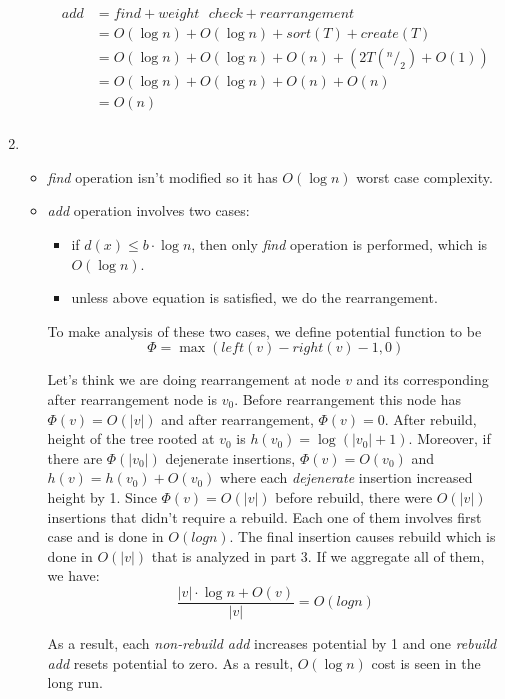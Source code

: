 \begin{enumerate}
\begin{itemize}
    \begin{align*}
      add &= find + weight\text{ }check + rearrangement \\
                  &= O(\log n) + O(\log n) + sort(T) + create(T) \\
                  &= O(\log n) + O(\log n)+ O(n) + (2T(^n/_2) + O(1)) \\
                  &= O(\log n) + O(\log n)+ O(n) + O(n) \\
                  &= O(n) \\
    \end{align*}
  \end{itemize}
  
  \item
  \begin{itemize}
    \item \textit{find} operation isn't modified so it has $O( \log n)$ worst case complexity.
    
    \item \textit{add} operation involves two cases:
      \begin{itemize}
        \item if $d(x) \leq b \cdot \log n$, then only \textit{find} operation is performed, which is $O(\log n)$.
        
        \item unless above equation is satisfied, we do the rearrangement.
      \end{itemize}
      
      To make analysis of these two cases, we define potential function to be 
      $$\Phi = \max (left(v) - right(v) - 1, 0)$$
      
      Let's think we are doing rearrangement at node $v$ and its corresponding after rearrangement node is $v_0$. Before rearrangement this node has $\Phi(v) = O(|v|)$ and after rearrangement, $\Phi(v) = 0$. 
      After rebuild, height of the tree rooted at $v_0$ is $h(v_0) = \log(|v_0| + 1)$. Moreover, if there are $\Phi(|v_0|)$ dejenerate insertions, $\Phi(v) = O(v_0)$ and $h(v) = h(v_0) + O(v_0)$ where each \textit{dejenerate} insertion increased height by 1. Since $\Phi(v) = O(|v|)$ before rebuild, there were $O(|v|)$ insertions that didn't require a rebuild. Each one of them involves first case and is done in $O(log n)$. The final insertion causes rebuild which is done in $O(|v|)$ that is analyzed in part 3. If we aggregate all of them, we have:      
      $$
        \frac{|v| \cdot \log n + O(v)}{|v|} = O(log n)      
      $$
      
      As a result, each \textit{non-rebuild add} increases potential by 1 and one \textit{rebuild add} resets potential to zero. As a result, $O(\log n)$ cost is seen in the long run.
  \end{itemize}


\end{enumerate}